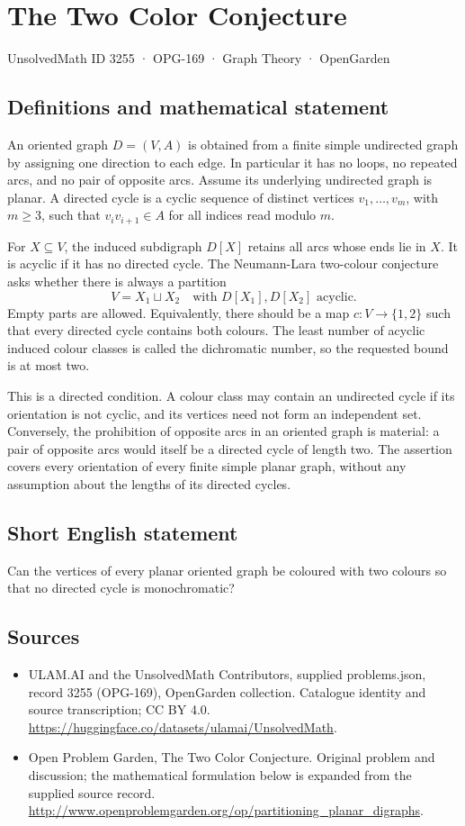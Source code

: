 \documentclass[11pt,a4paper]{article}
\begin{document}
\section*{The Two Color Conjecture}\label{3255}
{\small UnsolvedMath ID 3255 · OPG-169 · Graph Theory · OpenGarden}
\subsection{Definitions and mathematical statement}
An oriented graph $D=(V,A)$ is obtained from a finite simple undirected
graph by assigning one direction to each edge. In particular it has no
loops, no repeated arcs, and no pair of opposite arcs. Assume its
underlying undirected graph is planar. A directed cycle is a cyclic
sequence of distinct vertices $v_1,\ldots,v_m$, with $m\ge3$, such that
$v_i v_{i+1}\in A$ for all indices read modulo $m$.

For $X\subseteq V$, the induced subdigraph $D[X]$ retains all arcs whose
ends lie in $X$. It is acyclic if it has no directed cycle. The
Neumann-Lara two-colour conjecture asks whether there is always a
partition
\[
                  V=X_1\sqcup X_2
                  \quad\text{with }D[X_1],D[X_2]\text{ acyclic}.
\]
Empty parts are allowed. Equivalently, there should be a map
$c:V\to\{1,2\}$ such that every directed cycle contains both colours.
The least number of acyclic induced colour classes is called the
dichromatic number, so the requested bound is at most two.

This is a directed condition. A colour class may contain an undirected
cycle if its orientation is not cyclic, and its vertices need not form
an independent set. Conversely, the prohibition of opposite arcs in an
oriented graph is material: a pair of opposite arcs would itself be a
directed cycle of length two. The assertion covers every orientation of
every finite simple planar graph, without any assumption about the
lengths of its directed cycles.
\subsection{Short English statement}
Can the vertices of every planar oriented graph be coloured with two colours so that no directed cycle is monochromatic?
\subsection{Sources}
\begin{itemize}
\item[S1] ULAM.AI and the UnsolvedMath Contributors, supplied problems.json, record 3255 (OPG-169), OpenGarden collection. Catalogue identity and source transcription; CC BY 4.0.
\url{https://huggingface.co/datasets/ulamai/UnsolvedMath}.
\item[S2] Open Problem Garden, The Two Color Conjecture. Original problem and discussion; the mathematical formulation below is expanded from the supplied source record.
\url{http://www.openproblemgarden.org/op/partitioning_planar_digraphs}.
\end{itemize}
\end{document}
